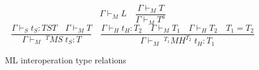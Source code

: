 \begin{figure}
\[
\Gamma\vdash_{M}L
\quad
\frac{\Gamma\vdash_{M}T}{\Gamma\vdash_{M}T^{a}}
\]
\[
\frac{\Gamma\vdash_{S}t_{S}:TST\quad\Gamma\vdash_{M}T}{\Gamma\vdash_{M}\;^{T}MS\;t_{S}:T}
\quad
\frac{\Gamma\vdash_{H}t_{H}:T_{2}\quad\Gamma\vdash_{M}T_{1}\quad\Gamma\vdash_{H}T_{2}\quad T_{1}=T_{2}}{\Gamma\vdash_{M}\;^{T_{1}}MH^{T_{2}}\;t_{H}:T_{1}}
\]
\caption{ML interoperation type relations}
\label{mitr}
\end{figure}